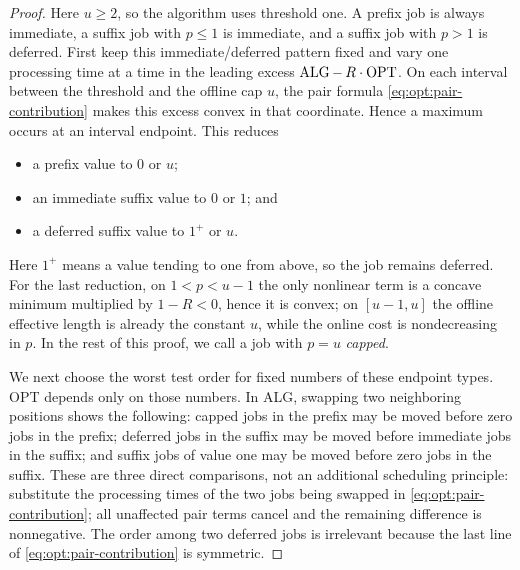 \begin{proof}
Here $u\ge2$, so the algorithm uses threshold one.  A prefix job is always
immediate, a suffix job with $p\le1$ is immediate, and a suffix job with
$p>1$ is deferred.  First keep this immediate/deferred pattern fixed and
vary one processing time at a time in the leading excess
$\operatorname{ALG}-\,R\cdot\operatorname{OPT}$.  On each interval between the threshold and the offline
cap $u$,
the pair formula \cref{eq:opt:pair-contribution} makes this excess convex in
that coordinate.  Hence a maximum occurs at an interval endpoint.  This
reduces
\begin{itemize}
\item a prefix value to $0$ or $u$;
\item an immediate suffix value to $0$ or $1$; and
\item a deferred suffix value to $1^+$ or $u$.
\end{itemize}
Here $1^+$ means a value tending to one from above, so the job remains
deferred.  For the last reduction, on $1<p<u-1$ the only nonlinear term is a
concave minimum multiplied by $1-R<0$, hence it is convex; on $[u-1,u]$ the
offline effective length is already the constant $u$, while the online cost
is nondecreasing in $p$.  In the rest of this proof, we call a job with
$p=u$ \emph{capped}.

We next choose the worst test order for fixed numbers of these endpoint
types.  OPT depends only on those numbers.  In ALG, swapping two neighboring
positions shows the following: capped jobs in the prefix may be moved before
zero jobs in the prefix; deferred jobs in the suffix may be moved before
immediate jobs in the suffix; and suffix jobs of value one may be moved
before zero jobs in the suffix.  These are three direct comparisons, not an
additional scheduling principle: substitute the processing times of the two
jobs being swapped in
\cref{eq:opt:pair-contribution}; all unaffected pair terms cancel and the
remaining difference is nonnegative.  The order among two deferred jobs is
irrelevant because the last line of \cref{eq:opt:pair-contribution} is
symmetric.


\end{proof}
